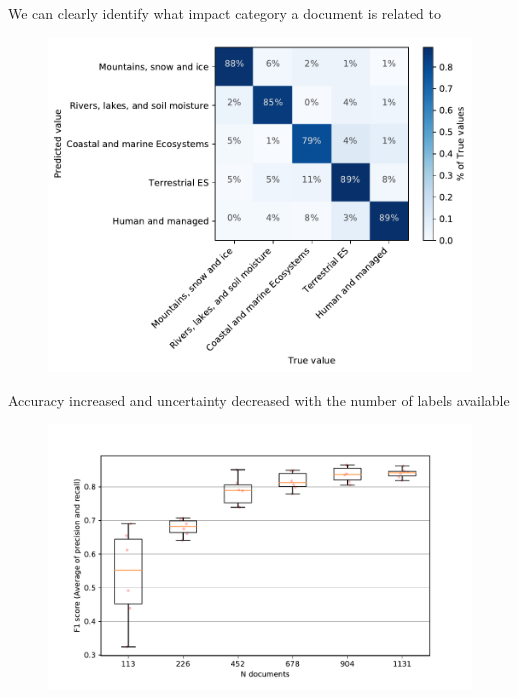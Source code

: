 \documentclass[9pt]{beamer}
\begin{document}
\begin{frame}{We can clearly identify what impact category a document is related to}

\begin{figure}
	\includegraphics[width=0.9\linewidth]{../plots/prediction_models/category_confusion.pdf}
\end{figure}

\end{frame}



\begin{frame}{Accuracy increased and uncertainty decreased with the number of labels available}

\begin{figure}
	\includegraphics[width=0.8\linewidth]{../plots/progress/cats_prediction_n.pdf}

\end{figure}

\end{frame}
\end{document}
